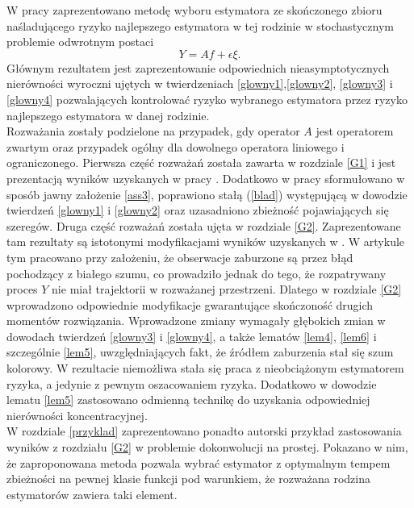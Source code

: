 \documentclass[man,mfiu]{mgrwms}
\begin{document}
\begin{zakonczenie}
W pracy zaprezentowano metodę wyboru estymatora ze skończonego zbioru naśladującego ryzyko najlepszego estymatora w tej rodzinie w stochastycznym problemie odwrotnym postaci 
\begin{displaymath}
Y =  Af+\epsilon\xi.
\end{displaymath}
Głównym rezultatem jest zaprezentowanie odpowiednich nieasymptotycznych nierówności wyroczni ujętych w twierdzeniach \ref{glowny1},\ref{glowny2}, \ref{glowny3} i \ref{glowny4} pozwalających kontrolować ryzyko wybranego estymatora przez ryzyko najlepszego estymatora w danej rodzinie.\\
\indent Rozważania zostały podzielone na przypadek, gdy operator $A$ jest operatorem zwartym oraz przypadek ogólny dla dowolnego operatora liniowego i ograniczonego.  Pierwsza część rozważań została zawarta w rozdziale \ref{G1} i jest prezentacją wyników uzyskanych w pracy \cite{cavalier1}. Dodatkowo w pracy sformułowano w sposób jawny założenie \ref{ass3}, poprawiono stałą (\ref{blad}) występującą w dowodzie twierdzeń \ref{glowny1} i \ref{glowny2} oraz uzasadniono zbieżność pojawiających się szeregów. Druga część rozważań została ujęta w rozdziale \ref{G2}. Zaprezentowane tam rezultaty są istotonymi modyfikacjami wyników uzyskanych w \cite{cavalier2}. W artykule tym pracowano przy założeniu, że obserwacje zaburzone są przez błąd pochodzący z białego szumu, co prowadziło jednak do tego, że rozpatrywany proces $Y$ nie miał trajektorii w rozważanej przestrzeni. Dlatego w rozdziale \ref{G2} wprowadzono odpowiednie modyfikacje gwarantujące skończoność drugich momentów rozwiązania. Wprowadzone zmiany wymagały głębokich zmian w dowodach twierdzeń \ref{glowny3} i \ref{glowny4}, a także lematów \ref{lem4}, \ref{lem6} i szczególnie \ref{lem5}, uwzględniających fakt, że źródłem zaburzenia stał się szum kolorowy. W rezultacie niemożliwa stała się praca z nieobciążonym estymatorem ryzyka, a jedynie z pewnym oszacowaniem ryzyka. Dodatkowo w dowodzie lematu \ref{lem5} zastosowano odmienną technikę do uzyskania odpowiedniej nierówności koncentracyjnej. \\
\indent W rozdziale \ref{przyklad} zaprezentowano ponadto autorski przykład zastosowania wyników z rozdziału \ref{G2} w problemie dokonwolucji na prostej. Pokazano w nim, że zaproponowana metoda pozwala wybrać estymator z optymalnym tempem zbieżności na pewnej klasie funkcji pod warunkiem, że rozważana rodzina estymatorów zawiera taki element.
\end{zakonczenie}
\end{document}
